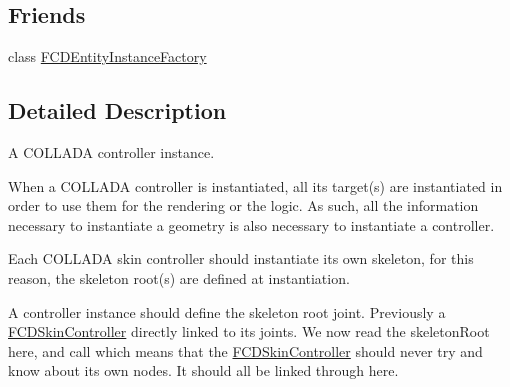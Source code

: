 \subsection*{Friends}
\begin{DoxyCompactItemize}
\item 
\hypertarget{classFCDControllerInstance_a069ebb98497ccbc5fdcb75ecfa8b15f7}{
class \hyperlink{classFCDControllerInstance_a069ebb98497ccbc5fdcb75ecfa8b15f7}{FCDEntityInstanceFactory}}
\label{classFCDControllerInstance_a069ebb98497ccbc5fdcb75ecfa8b15f7}

\end{DoxyCompactItemize}


\subsection{Detailed Description}
A COLLADA controller instance.

When a COLLADA controller is instantiated, all its target(s) are instantiated in order to use them for the rendering or the logic. As such, all the information necessary to instantiate a geometry is also necessary to instantiate a controller.

Each COLLADA skin controller should instantiate its own skeleton, for this reason, the skeleton root(s) are defined at instantiation.

A controller instance should define the skeleton root joint. Previously a \hyperlink{classFCDSkinController}{FCDSkinController} directly linked to its joints. We now read the skeletonRoot here, and call which means that the \hyperlink{classFCDSkinController}{FCDSkinController} should never try and know about its own nodes. It should all be linked through here. 

